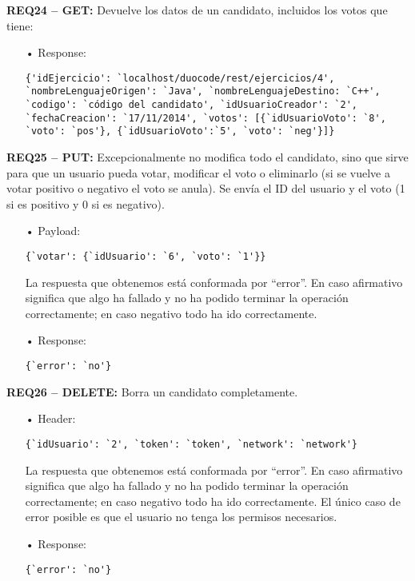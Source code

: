 \textbf{REQ24 – GET:} Devuelve los datos de un candidato, incluidos los votos que tiene:
\begin{itemize}
\item[•]
Response: 
{\codesize
\begin{verbatim}
{'idEjercicio': `localhost/duocode/rest/ejercicios/4', 
`nombreLenguajeOrigen': `Java', `nombreLenguajeDestino: `C++', 
`codigo': `código del candidato', `idUsuarioCreador': `2', 
`fechaCreacion': `17/11/2014', `votos': [{`idUsuarioVoto': `8', 
`voto': `pos'}, {`idUsuarioVoto':`5', `voto': `neg'}]}
\end{verbatim}
}
\end{itemize}

\textbf{REQ25 – PUT:} Excepcionalmente no modifica todo el candidato, sino que sirve para que un usuario pueda votar, modificar el voto o eliminarlo (si se vuelve a votar positivo o negativo el voto se anula). Se envía el ID del usuario y el voto (1 si es positivo y 0 si es negativo).
\begin{itemize}
\item[•]
Payload: 
{\codesize
\begin{verbatim}
{`votar': {`idUsuario': `6', `voto': `1'}}
\end{verbatim}
}

La respuesta que obtenemos está conformada por ``error''. En caso afirmativo significa que algo ha fallado y no ha podido terminar la operación correctamente; en caso negativo todo ha ido correctamente. 
\item[•]
Response:
{\codesize
\begin{verbatim} 
{`error': `no'}
\end{verbatim}
}
\end{itemize}

\textbf{REQ26 – DELETE:} Borra un candidato completamente.
\begin{itemize}
\item[•]
Header:
{\codesize
\begin{verbatim} 
{`idUsuario': `2', `token': `token', `network': `network'}
\end{verbatim}
}

La respuesta que obtenemos está conformada por ``error''. En caso afirmativo significa que algo ha fallado y no ha podido terminar la operación correctamente; en caso negativo todo ha ido correctamente. El único caso de error posible es que el usuario no tenga los permisos necesarios.
\item[•]
Response: 
{\codesize
\begin{verbatim}
{`error': `no'}
\end{verbatim}
}
\end{itemize}

